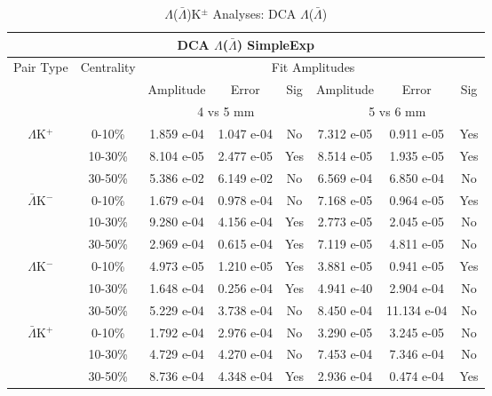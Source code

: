 \documentclass[../AnalysisNoteJBuxton.tex]{subfiles}
\begin{document}
\begin{table}
 \centering
 \begin{tabular}{|c|c|c|c|c||c|c|c|}
  \multicolumn{8}{c}{DCA $\Lambda$($\bar{\Lambda}$) SimpleExp} \\
  \hline
  \multirow{3}{*}{Pair Type} & \multirow{3}{*}{Centrality} & \multicolumn{6}{c|}{Fit Amplitudes} \\
  \cline{3-8}
   & & Amplitude & Error & Sig & Amplitude & Error & Sig \\  
  \cline{3-8}
   & & \multicolumn{3}{c||}{4 vs 5 mm} & \multicolumn{3}{c|}{5 vs 6 mm} \\  
  \hline
  \multirow{3}{*}{$\Lambda$K$^{+}$}
   &  0-10\% & 1.859 e-04 & 1.047 e-04 & No & 7.312 e-05 & 0.911 e-05 & Yes \\
   & 10-30\% & 8.104 e-05 & 2.477 e-05 & Yes & 8.514 e-05 & 1.935 e-05 & Yes \\
   & 30-50\% & 5.386 e-02 & 6.149 e-02 & No & 6.569 e-04 & 6.850 e-04 & No \\
  \hline
  \multirow{3}{*}{$\bar{\Lambda}$K$^{-}$}
   &  0-10\% & 1.679 e-04 & 0.978 e-04 & No & 7.168 e-05 & 0.964 e-05 & Yes \\
   & 10-30\% & 9.280 e-04 & 4.156 e-04 & Yes & 2.773 e-05 & 2.045 e-05 & No \\
   & 30-50\% & 2.969 e-04 & 0.615 e-04 & Yes & 7.119 e-05 & 4.811 e-05 & No \\
  \hline \hline
  \multirow{3}{*}{$\Lambda$K$^{-}$}
   &  0-10\% & 4.973 e-05 & 1.210 e-05 & Yes & 3.881 e-05 & 0.941 e-05 & Yes \\
   & 10-30\% & 1.648 e-04 & 0.256 e-04 & Yes & 4.941 e-40 & 2.904 e-04 & No \\
   & 30-50\% & 5.229 e-04 & 3.738 e-04 & No & 8.450 e-04 & 11.134 e-04 & No \\
  \hline
  \multirow{3}{*}{$\bar{\Lambda}$K$^{+}$}
   &  0-10\% & 1.792 e-04 & 2.976 e-04 & No & 3.290 e-05 & 3.245 e-05 & No \\
   & 10-30\% & 4.729 e-04 & 4.270 e-04 & No & 7.453 e-04 & 7.346 e-04 & No \\
   & 30-50\% & 8.736 e-04 & 4.348 e-04 & Yes & 2.936 e-04 & 0.474 e-04 & Yes \\
  \hline
 \end{tabular}
 \caption{$\Lambda$($\bar{\Lambda}$)K$^{\pm}$ Analyses: DCA $\Lambda$($\bar{\Lambda}$)}
 \label{tab:V0DcaLamKch_SimpleExp}
\end{table}
\end{document}
